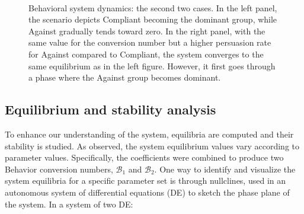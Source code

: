 \begin{figure}[h]
	\centering
	 \quad
	 \\
		\caption[Behavioral model simulation second]{Behavioral system dynamics: the second two cases. In the left panel, the scenario depicts Compliant becoming the dominant group, while Against gradually tends toward zero. In the right panel, with the same value for the conversion number but a higher persuasion rate for Against compared to Compliant, the system converges to the same equilibrium as in the left figure. However, it first goes through a phase where the Against group becomes dominant.}
	\label{fig:model__behavior_sim_2}
\end{figure}

\subsection{Equilibrium and stability analysis}
To enhance our understanding of the system, equilibria are computed and their stability is studied. As observed, the system equilibrium values vary according to parameter values. Specifically, the coefficients were combined to produce two Behavior conversion numbers, $\mathcal{B}_1$ and $\mathcal{B}_2$. One way to identify and visualize the system equilibria for a specific parameter set is through nullclines, used in an autonomous system of differential equations (DE)  to sketch the phase plane of the system. In a system of two DE: 
  
